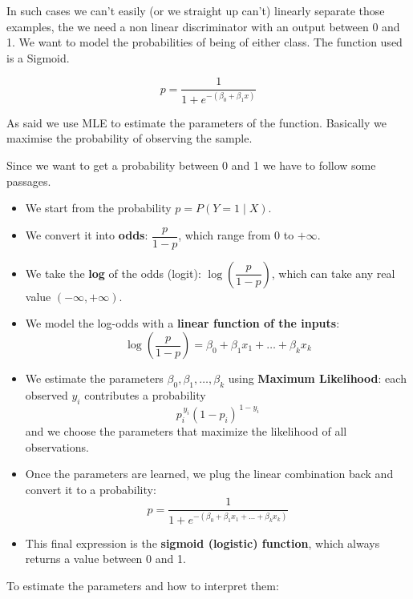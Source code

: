 In such cases we can't easily (or we straight up can't) linearly separate those examples, the we need a non linear discriminator with an output between 0 and 1. We want to model the probabilities of being of either class. The function used is a Sigmoid.

\begin{equation}
    p = \frac{1}{1 + e^{-(\beta_0 +\beta_1x)}}
\end{equation}

As said we use MLE to estimate the parameters of the function. Basically we maximise the 
probability of observing the sample.

\vspace{10pt}

Since we want to get a probability between 0 and 1 we have to follow some passages.
\begin{itemize}
    \item We start from the probability \(p = P(Y=1 \mid X)\).
    \item We convert it into \textbf{odds}: \(\dfrac{p}{1-p}\), which range from \(0\) to \(+\infty\).
    \item We take the \textbf{log} of the odds (logit): \(\log\left(\dfrac{p}{1-p}\right)\), which can take any real value \((-\infty, +\infty)\).
    \item We model the log-odds with a \textbf{linear function of the inputs}:  
    \[
    \log\left(\dfrac{p}{1-p}\right) = \beta_0 + \beta_1 x_1 + \dots + \beta_k x_k
    \]
    \item We estimate the parameters \(\beta_0, \beta_1, \dots, \beta_k\) using \textbf{Maximum Likelihood}:  
    each observed \(y_i\) contributes a probability  
    \[
    p_i^{\,y_i} (1 - p_i)^{\,1 - y_i}
    \]
    and we choose the parameters that maximize the likelihood of all observations.
    \item Once the parameters are learned, we plug the linear combination back and convert it to a probability:
    \[
    p = \frac{1}{1 + e^{-(\beta_0 + \beta_1 x_1 + \dots + \beta_k x_k)}}
    \]
    \item This final expression is the \textbf{sigmoid (logistic) function}, which always returns a value between 0 and 1.
\end{itemize}

\vspace{10pt}

To estimate the parameters and how to interpret them:


